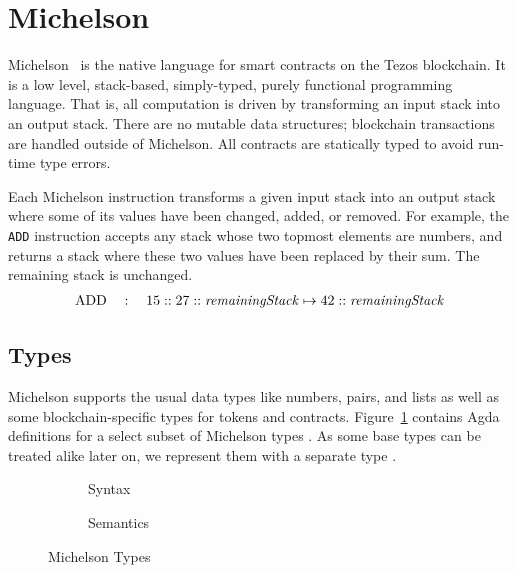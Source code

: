 \section{Michelson}
\label{sec:michelson}
\label{sec:Mtype}


Michelson~\cite{michelson,devres} is the native language for smart contracts on the Tezos blockchain.
It is a low level, stack-based, simply-typed, purely functional programming
language. That is, all computation is driven by transforming an input
stack into an output stack. There are no mutable data structures;
blockchain transactions are handled outside of Michelson.
All contracts are statically typed to avoid run-time type errors.

Each Michelson instruction transforms a given input stack into an output stack
where some of its values have been changed, added, or removed.
For example, the \verb=ADD= instruction accepts any stack
whose two topmost elements are numbers,
and returns a stack where these two values have been replaced by their sum. The remaining stack is unchanged.
\begin{align*}
	\text{ADD} \quad:\quad 15 :: 27 :: \text{\emph{remainingStack}}
	\mapsto	           42 :: \text{\emph{remainingStack}}
\label{equ:ADD}
\end{align*}

\subsection{Types}
\label{sec:michelson-types}

Michelson supports the usual data types like numbers, pairs, and lists as well as
some blockchain-specific types for tokens and contracts. 
Figure~\ref{fig:Type} contains Agda definitions for a select subset of
Michelson types {\AType}. As some base types can be treated alike later on, we
represent them with a separate type {\ABaseType}.

\begin{figure}[tp]
  \begin{subfigure}{0.48\textwidth}
    \noindent
    \TypesType
    \TypesPatterns
    \caption{Syntax}
    \label{fig:Type}
  \end{subfigure}
  \begin{subfigure}{0.48\textwidth}
  \TypesSemantics
  \caption{Semantics}
  \label{fig:Type-Semantics}
\end{subfigure}
\caption{Michelson Types}
\label{Type}
\end{figure}

